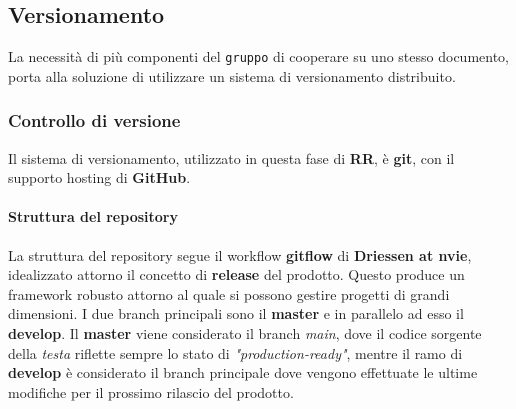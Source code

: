 \subsection{Versionamento}
La necessità di più componenti del \texttt{gruppo} di cooperare su uno stesso documento, porta alla soluzione di utilizzare un sistema di versionamento distribuito. 


\subsubsection{Controllo di versione}
Il sistema di versionamento, utilizzato in questa fase di \textbf{RR}, è \textbf{git}, con il supporto hosting di \textbf{GitHub}.

\paragraph{Struttura del repository  ~\\} 
La struttura del repository segue il workflow \textbf{gitflow} di \textbf{Driessen at nvie}, idealizzato attorno il concetto di \textbf{release} del prodotto. Questo produce
un framework robusto attorno al quale si possono gestire progetti di grandi dimensioni. I due branch principali sono il \textbf{master} e in parallelo ad esso il \textbf{develop}. 
Il \textbf{master} viene considerato il branch \textit{main}, dove il codice sorgente della \textit{testa} riflette sempre lo stato di \textit{"production-ready"},
mentre il ramo di \textbf{develop} è considerato il branch principale dove vengono effettuate le ultime modifiche per il prossimo rilascio del prodotto. 


